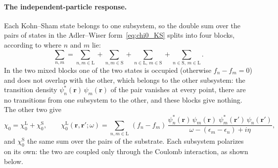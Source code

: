 \documentclass[10pt,a4paper]{paper}
\begin{document}
\paragraph{The independent-particle response.} Each Kohn--Sham state belongs to one subsystem, so the double sum over
the pairs of states in the Adler--Wiser form~\eqref{eq:chi0_KS} splits into four blocks, according to where $n$ and
$m$ lie:
\begin{equation*}
\sum_{n,m} = \sum_{n,m\in\mathrm{L}} + \sum_{n,m\in\mathrm{S}} + \sum_{n\in\mathrm{L},\,m\in\mathrm{S}}
+ \sum_{n\in\mathrm{S},\,m\in\mathrm{L}} .
\end{equation*}
In the two mixed blocks one of the two states is occupied (otherwise $f_n - f_m = 0$) and does not overlap with the
other, which belongs to the other subsystem: the transition density $\psi_n^*(\bm{r})\,\psi_m(\bm{r})$ of the pair
vanishes at every point, there are no transitions from one subsystem to the other, and these blocks give nothing. The other two give
\begin{equation}
\chi_0 = \chi_0^{\mathrm{L}} + \chi_0^{\mathrm{S}} , \qquad
\chi_0^{\mathrm{L}}(\bm{r},\bm{r}';\omega) = \sum_{n,m\in\mathrm{L}}\,(f_n - f_m)\,
\frac{\psi_n^*(\bm{r})\,\psi_m(\bm{r})\;\psi_m^*(\bm{r}')\,\psi_n(\bm{r}')}{\omega - (\epsilon_m - \epsilon_n) + i\eta} ,
\label{eq:chi0_split}
\end{equation}
and $\chi_0^{\mathrm{S}}$ the same sum over the pairs of the substrate.
Each subsystem polarizes on its own: the two are coupled only through the Coulomb interaction, as shown below.
\end{document}
